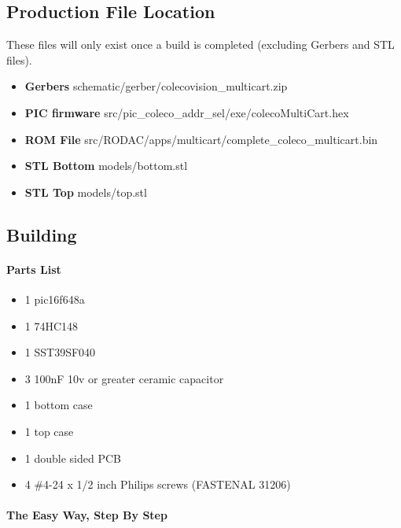 \documentclass{article}
\begin{document}
  \subsection{Production File Location}

  \par
  These files will only exist once a build is completed (excluding Gerbers and STL files).

  \begin{itemize}
    \item \textbf{Gerbers} schematic/gerber/colecovision\_multicart.zip
    \item \textbf{PIC firmware} src/pic\_coleco\_addr\_sel/exe/colecoMultiCart.hex
    \item \textbf{ROM File} src/RODAC/apps/multicart/complete\_coleco\_multicart.bin
    \item \textbf{STL Bottom} models/bottom.stl
    \item \textbf{STL Top} models/top.stl
  \end{itemize}

  \subsection{Building}

  \paragraph{Parts List} \label{Parts}

  \par
  \begin{itemize}
    \item 1 pic16f648a
    \item 1 74HC148
    \item 1 SST39SF040
    \item 3 100nF 10v or greater ceramic capacitor
    \item 1 bottom case
    \item 1 top case
    \item 1 double sided PCB
    \item 4 \#4-24 x 1/2 inch Philips screws (FASTENAL 31206)
  \end{itemize}

  \par
  \paragraph{The Easy Way, Step By Step}
\end{document}
